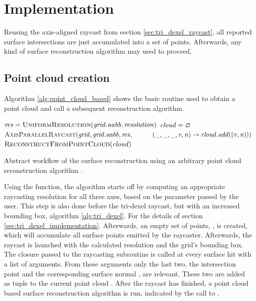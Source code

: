 \section{Implementation}
\label{sec:point_cloud_implementation}

Reusing the axis-aligned raycast from section \ref{sec:tri_dexel_raycast}, all reported surface intersections are just accumulated into a set of points.
Afterwards, any kind of surface reconstruction algorithm may used to proceed.

\subsection{Point cloud creation}
\label{sec:point_cloud_creation}

Algorithm \ref{alg:point_cloud_based} shows the basic routine used to obtain a point cloud and call a subsequent reconstruction algorithm.
%
\begin{algorithm}
	\centering
	\begin{algorithmic}[1]
			\State $\var{res} = \Call{UniformResolution}{\var{grid}.\var{aabb}, \var{resolution}}$
			\State $\mathit{cloud} = \varnothing$
			\State $\Call{AxisParallelRaycast}{\var{grid}, \var{grid}.\var{aabb}, \var{res},\hfill\break
				\hspace*{\dimexpr\algorithmicindent*2}(\var{\_}, \var{\_}, \var{\_}, \var{v}, \var{n}) \rightarrow \var{cloud}.\var{add}((\var{v}, \var{n}))}$
			\State \Return $\Call{ReconstructFromPointCloud}{\var{cloud}}$
		\EndFunction
	\end{algorithmic}
	\caption{
		Abstract workflow of the surface reconstruction using an arbitrary point cloud reconstruction algorithm .
	}
	\label{alg:point_cloud_based}
\end{algorithm}
%
Using the  function, the algorithm starts off by computing an appropriate raycasting resolution  for all three axes, based on the  parameter passed by the user.
This step is also done before the tri-dexel raycast, but with an increased bounding box, \cf algorithm \ref{alg:tri_dexel}.
For the details of  \cf section \ref{sec:tri_dexel_implementation}.
Afterwards, an empty set of points, , is created, which will accumulate all surface points emitted by the raycaster.
Afterwards, the raycast is launched with the calculated resolution and the grid's bounding box.
The closure passed to the raycasting subroutine  is called at every surface hit with a list of arguments.
From these arguments only the last two, the intersection point  and the corresponding surface normal , are relevant.
These two are added as tuple to the current point cloud .
After the raycast has finished, a point cloud based surface reconstruction algorithm is run, indicated by the call to .

